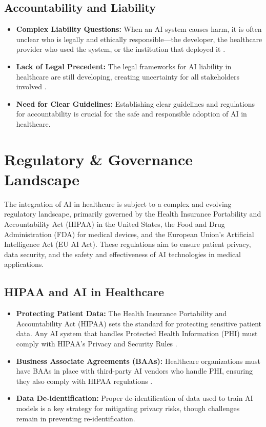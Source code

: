 \subsection{Accountability and Liability}
\begin{itemize}
    \item \textbf{Complex Liability Questions:} When an AI system causes harm, it is often unclear who is legally and ethically responsible—the developer, the healthcare provider who used the system, or the institution that deployed it \cite{NIH_AlgorithmicBias}.
    \item \textbf{Lack of Legal Precedent:} The legal frameworks for AI liability in healthcare are still developing, creating uncertainty for all stakeholders involved \cite{IBANet_Accountability}.
    \item \textbf{Need for Clear Guidelines:} Establishing clear guidelines and regulations for accountability is crucial for the safe and responsible adoption of AI in healthcare.
\end{itemize}

\section{Regulatory \& Governance Landscape}

The integration of AI in healthcare is subject to a complex and evolving regulatory landscape, primarily governed by the Health Insurance Portability and Accountability Act (HIPAA) in the United States, the Food and Drug Administration (FDA) for medical devices, and the European Union's Artificial Intelligence Act (EU AI Act). These regulations aim to ensure patient privacy, data security, and the safety and effectiveness of AI technologies in medical applications.

\subsection{HIPAA and AI in Healthcare}
\begin{itemize}
    \item \textbf{Protecting Patient Data:} The Health Insurance Portability and Accountability Act (HIPAA) sets the standard for protecting sensitive patient data. Any AI system that handles Protected Health Information (PHI) must comply with HIPAA's Privacy and Security Rules \cite{Foley_HIPAA}.
    \item \textbf{Business Associate Agreements (BAAs):} Healthcare organizations must have BAAs in place with third-party AI vendors who handle PHI, ensuring they also comply with HIPAA regulations \cite{SimboAI_HIPAA}.
    \item \textbf{Data De-identification:} Proper de-identification of data used to train AI models is a key strategy for mitigating privacy risks, though challenges remain in preventing re-identification.
\end{itemize}

